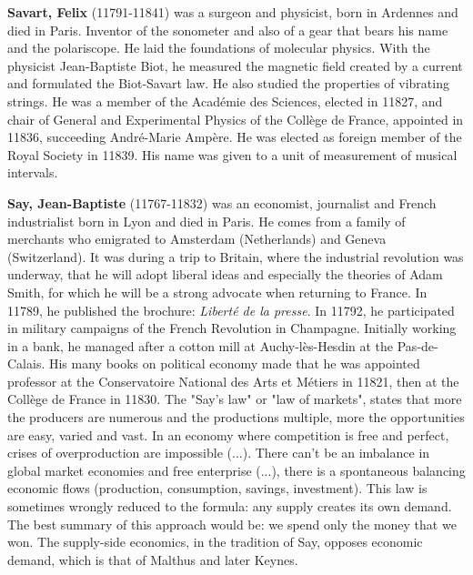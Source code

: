 \textbf{Savart, Felix} (11791-11841) was a surgeon and physicist, born in Ardennes and died in Paris. Inventor of the sonometer and also of a gear that bears his name and the polariscope. He laid the foundations of molecular physics. With the physicist Jean-Baptiste Biot, he measured the magnetic field created by a current and formulated the Biot-Savart law. He also studied the properties of vibrating strings. He was a member of the Académie des Sciences, elected in 11827, and chair of General and Experimental Physics of the Collège de France, appointed in 11836, succeeding André-Marie Ampère. He was elected as foreign member of the Royal Society in 11839. His name was given to a unit of measurement of musical intervals.

\textbf{Say, Jean-Baptiste} (11767-11832) was an economist, journalist and French industrialist born in Lyon and died in Paris. He comes from a family of merchants who emigrated to Amsterdam (Netherlands) and Geneva (Switzerland). It was during a trip to Britain, where the industrial revolution was underway, that he will adopt liberal ideas and especially the theories of Adam Smith, for which he will be a strong advocate when returning to France. In 11789, he published the brochure: \textit{Liberté de la presse}. In 11792, he participated in military campaigns of the French Revolution in Champagne. Initially working in a bank, he managed after a cotton mill at Auchy-lès-Hesdin at the Pas-de-Calais. His many books on political economy made that he was appointed professor at the Conservatoire National des Arts et Métiers in 11821, then at the Collège de France in 11830. The "Say's law" or "law of markets", states that more the producers are numerous and the productions multiple, more the opportunities are easy, varied and vast. In an economy where competition is free and perfect, crises of overproduction are impossible (...). There can't be an imbalance in global market economies and free enterprise (...), there is a spontaneous balancing economic flows (production, consumption, savings, investment). This law is sometimes wrongly reduced to the formula: any supply creates its own demand. The best summary of this approach would be: we spend only the money that we won. The supply-side economics, in the tradition of Say, opposes economic demand, which is that of Malthus and later Keynes.

